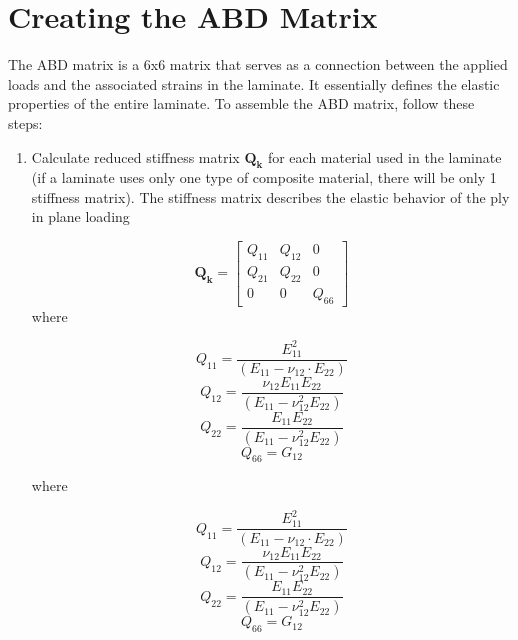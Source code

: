 \documentclass{article}
\begin{document}




\section{Creating the ABD Matrix}
The ABD matrix is a 6x6 matrix that serves as a connection between the applied loads and the associated strains in the laminate. It essentially defines the elastic properties of the entire laminate. To assemble the ABD matrix, follow these steps:

\begin{enumerate}
    \item Calculate reduced stiffness matrix $\bm{Q_{k}}$ for each material used in the laminate (if a laminate uses only one type of composite material, there will be only 1 stiffness matrix). The stiffness matrix describes the elastic behavior of the ply in plane loading

    \begin{equation}
        \bm{Q_{k}} = \left[ \begin{array}{ccc}
                                Q_{11} & Q_{12} & 0 \\
                                Q_{21} & Q_{22} & 0 \\
                                0  &      0     & Q_{66}
                            \end{array} \right]
    \end{equation}
    where

    $$
        Q_{11} = \frac{E_{11}^{2}}{\left(E_{11} - \nu_{12} \cdot E_{22}\right)}
    $$ \vspace{1mm}
    $$
        Q_{12} = \frac{\nu_{12} E_{11} E_{22}}{\left(E_{11} - \nu_{12}^2 E_{22}\right)}
    $$ \vspace{1mm}
    $$
        Q_{22} = \frac{E_{11} E_{22}}{\left(E_{11} - \nu_{12}^2 E_{22}\right)}
    $$ \vspace{1mm}
    $$
        Q_{66} = G_{12}
    $$

    where

    $$
        Q_{11} = \frac{E_{11}^{2}}{\left(E_{11} - \nu_{12} \cdot E_{22}\right)}
    $$ \vspace{1mm}
    $$
        Q_{12} = \frac{\nu_{12} E_{11} E_{22}}{\left(E_{11} - \nu_{12}^2 E_{22}\right)}
    $$ \vspace{1mm}
    $$
        Q_{22} = \frac{E_{11} E_{22}}{\left(E_{11} - \nu_{12}^2 E_{22}\right)}
    $$ \vspace{1mm}
    $$
        Q_{66} = G_{12}
    $$


\end{enumerate}
\end{document}
